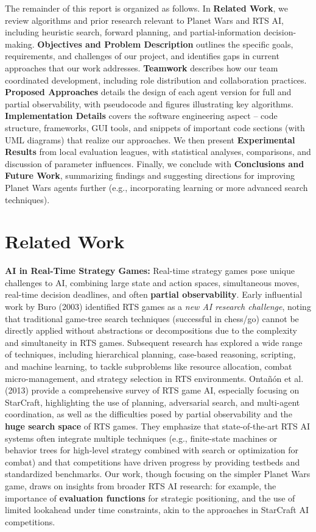 \documentclass[conference]{IEEEtran}
\begin{document}
The remainder of this report is organized as follows. In \textbf{Related Work}, we review algorithms and prior research relevant to Planet Wars and RTS AI, including heuristic search, forward planning, and partial-information decision-making. \textbf{Objectives and Problem Description} outlines the specific goals, requirements, and challenges of our project, and identifies gaps in current approaches that our work addresses. \textbf{Teamwork} describes how our team coordinated development, including role distribution and collaboration practices. \textbf{Proposed Approaches} details the design of each agent version for full and partial observability, with pseudocode and figures illustrating key algorithms. \textbf{Implementation Details} covers the software engineering aspect -- code structure, frameworks, GUI tools, and snippets of important code sections (with UML diagrams) that realize our approaches. We then present \textbf{Experimental Results} from local evaluation leagues, with statistical analyses, comparisons, and discussion of parameter influences. Finally, we conclude with \textbf{Conclusions and Future Work}, summarizing findings and suggesting directions for improving Planet Wars agents further (e.g., incorporating learning or more advanced search techniques).

\section{Related Work}

\textbf{AI in Real-Time Strategy Games:} Real-time strategy games pose unique challenges to AI, combining large state and action spaces, simultaneous moves, real-time decision deadlines, and often \textbf{partial observability}. Early influential work by Buro (2003) \cite{buro2003} identified RTS games as a \textit{new AI research challenge}, noting that traditional game-tree search techniques (successful in chess/go) cannot be directly applied without abstractions or decompositions due to the complexity and simultaneity in RTS games. Subsequent research has explored a wide range of techniques, including hierarchical planning, case-based reasoning, scripting, and machine learning, to tackle subproblems like resource allocation, combat micro-management, and strategy selection in RTS environments. Ontañón et al. (2013) \cite{ontanon2013} provide a comprehensive survey of RTS game AI, especially focusing on StarCraft, highlighting the use of planning, adversarial search, and multi-agent coordination, as well as the difficulties posed by partial observability and the \textbf{huge search space} of RTS games. They emphasize that state-of-the-art RTS AI systems often integrate multiple techniques (e.g., finite-state machines or behavior trees for high-level strategy combined with search or optimization for combat) and that competitions have driven progress by providing testbeds and standardized benchmarks. Our work, though focusing on the simpler Planet Wars game, draws on insights from broader RTS AI research: for example, the importance of \textbf{evaluation functions} for strategic positioning, and the use of limited lookahead under time constraints, akin to the approaches in StarCraft AI competitions.
\end{document}

